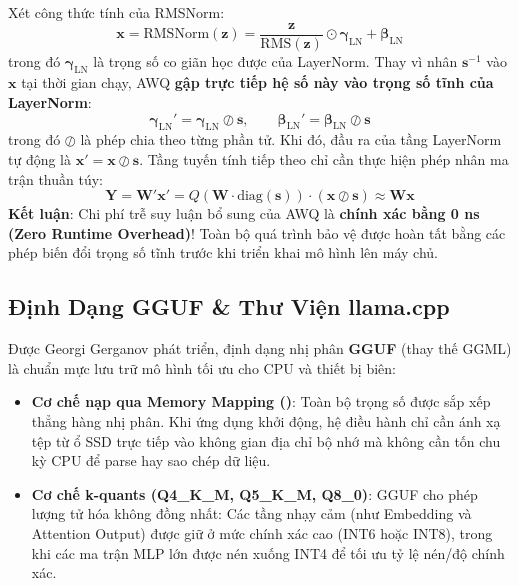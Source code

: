 Xét công thức tính của RMSNorm:
\begin{equation}
\mathbf{x} = \text{RMSNorm}(\mathbf{z}) = \frac{\mathbf{z}}{\text{RMS}(\mathbf{z})} \odot \boldsymbol{\gamma}_{\text{LN}} + \boldsymbol{\beta}_{\text{LN}}
\end{equation}
trong đó $\boldsymbol{\gamma}_{\text{LN}}$ là trọng số co giãn học được của LayerNorm.
Thay vì nhân $\mathbf{s}^{-1}$ vào $\mathbf{x}$ tại thời gian chạy, AWQ \textbf{gập trực tiếp hệ số này vào trọng số tĩnh của LayerNorm}:
\begin{equation}
\boldsymbol{\gamma}_{\text{LN}}' = \boldsymbol{\gamma}_{\text{LN}} \oslash \mathbf{s}, \qquad \boldsymbol{\beta}_{\text{LN}}' = \boldsymbol{\beta}_{\text{LN}} \oslash \mathbf{s}
\end{equation}
trong đó $\oslash$ là phép chia theo từng phần tử.
Khi đó, đầu ra của tầng LayerNorm tự động là $\mathbf{x}' = \mathbf{x} \oslash \mathbf{s}$.
Tầng tuyến tính tiếp theo chỉ cần thực hiện phép nhân ma trận thuần túy:
\begin{equation}
\mathbf{Y} = \mathbf{W}' \mathbf{x}' = Q(\mathbf{W} \cdot \text{diag}(\mathbf{s})) \cdot (\mathbf{x} \oslash \mathbf{s}) \approx \mathbf{W} \mathbf{x}
\end{equation}
\textbf{Kết luận}: Chi phí trễ suy luận bổ sung của AWQ là \textbf{chính xác bằng 0 ns (Zero Runtime Overhead)}! Toàn bộ quá trình bảo vệ được hoàn tất bằng các phép biến đổi trọng số tĩnh trước khi triển khai mô hình lên máy chủ.

\subsection{Định Dạng GGUF \& Thư Viện llama.cpp}
Được Georgi Gerganov phát triển, định dạng nhị phân \textbf{GGUF} (thay thế GGML) là chuẩn mực lưu trữ mô hình tối ưu cho CPU và thiết bị biên:
\begin{itemize}
  \item \textbf{Cơ chế nạp qua Memory Mapping ()}: Toàn bộ trọng số được sắp xếp thẳng hàng nhị phân. Khi ứng dụng khởi động, hệ điều hành chỉ cần ánh xạ tệp từ ổ SSD trực tiếp vào không gian địa chỉ bộ nhớ mà không cần tốn chu kỳ CPU để parse hay sao chép dữ liệu.
  \item \textbf{Cơ chế k-quants (Q4\_K\_M, Q5\_K\_M, Q8\_0)}: GGUF cho phép lượng tử hóa không đồng nhất: Các tầng nhạy cảm (như Embedding và Attention Output) được giữ ở mức chính xác cao (INT6 hoặc INT8), trong khi các ma trận MLP lớn được nén xuống INT4 để tối ưu tỷ lệ nén/độ chính xác.
\end{itemize}

